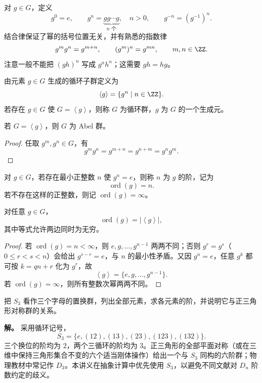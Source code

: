 对 $g\in G$，定义
\[
g^0=e,
\qquad
g^n=\underbrace{gg\cdots g}_{n\text{ 个}},\quad n>0,
\qquad
g^{-n}=(g^{-1})^n.
\]
结合律保证了幂的括号位置无关，并有熟悉的指数律
\[
g^m g^n=g^{m+n},
\qquad
(g^m)^n=g^{mn},
\qquad m,n\in\ZZ.
\]
注意一般不能把 $(gh)^n$ 写成 $g^nh^n$；这需要 $gh=hg$。

\begin{definition}[生成子群与循环群]
由元素 $g\in G$ 生成的循环子群定义为
\[
\left\langle g\right\rangle=\{g^n\mid n\in\ZZ\}.
\]
若存在 $g\in G$ 使 $G=\left\langle g\right\rangle$，则称 $G$ 为循环群，$g$ 为 $G$ 的一个生成元。
\label{def:cyclic-group}
\end{definition}

\begin{proposition}
若 $G=\left\langle g\right\rangle$，则 $G$ 为 Abel 群。

\end{proposition}

\begin{proof}
任取 $g^m,g^n\in G$，有
\[
g^m g^n=g^{m+n}=g^{n+m}=g^n g^m.
\]
\end{proof}

\begin{definition}[群元的阶]
对 $g\in G$，若存在最小正整数 $n$ 使 $g^n=e$，则称 $n$ 为 $g$ 的阶，记为
\[
\operatorname{ord}(g)=n.
\]
若不存在这样的正整数，则记 $\operatorname{ord}(g)=\infty$。
\label{def:element-order}
\end{definition}

\begin{proposition}[群元的阶与循环子群]
对任意 $g\in G$，
\[
\operatorname{ord}(g)=\lvert\left\langle g\right\rangle\rvert,
\]
其中等式允许两边同时为无穷。
\label{prop:element-order-cyclic}

\end{proposition}

\begin{proof}
若 $\operatorname{ord}(g)=n<\infty$，则 $e,g,\dots,g^{n-1}$ 两两不同；否则 $g^r=g^s$（$0\le r<s<n$）会给出 $g^{s-r}=e$，与 $n$ 的最小性矛盾。又因 $g^n=e$，任意 $g^k$ 都可按 $k=qn+r$ 化为 $g^r$，故
\[
\left\langle g\right\rangle=\{e,g,\dots,g^{n-1}\}.
\]
若 $\operatorname{ord}(g)=\infty$，则所有整数次幂两两不同。
\end{proof}

\begin{example}[$S_3$ 的基本结构]
把 $S_3$ 看作三个字母的置换群，列出全部元素，求各元素的阶，并说明它与正三角形对称群的关系。

\textbf{解。} 采用循环记号，
\[
S_3=\{e,(12),(13),(23),(123),(132)\}.
\]
三个换位的阶均为 $2$，两个三循环的阶均为 $3$。正三角形的全部平面对称（或在三维中保持三角形集合不变的六个适当刚体操作）给出一个与 $S_3$ 同构的六阶群；物理教材中常记作 $D_3$。本讲义在抽象计算中优先使用 $S_3$，以避免不同文献对 $D_n$ 阶数约定的歧义。
\end{example}

